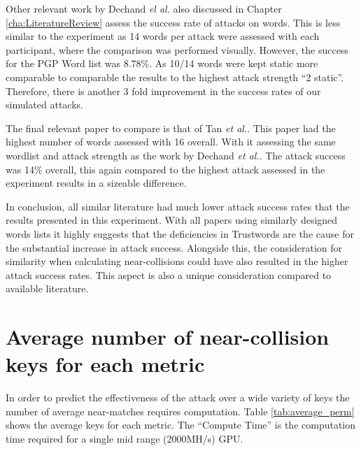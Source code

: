 Other relevant work by Dechand \textit{el al.}\cite{dechand2016empirical} also discussed in Chapter \ref{cha:LiteratureReview} assess the success rate of attacks on words. This is less similar to the experiment as 14 words per attack were assessed with each participant, where the comparison was performed visually. However, the success for the PGP Word list was 8.78\%. As 10/14 words were kept static more comparable to comparable the results to the highest attack strength ``2 static''. Therefore, there is another 3 fold improvement in the success rates of our simulated attacks. 

The final relevant paper to compare is that of Tan \textit{et al.}. This paper had the highest number of words assessed with 16 overall. With it assessing the same wordlist and attack strength as the work by Dechand \textit{et al.}. The attack success was 14\% overall, this again compared to the highest attack assessed in the experiment results in a sizeable difference.

In conclusion, all similar literature had much lower attack success rates that the results presented in this experiment. With all papers using similarly designed words lists it highly suggests that the deficiencies in Trustwords are the cause for the substantial increase in attack success. Alongside this, the consideration for similarity when calculating near-collisions could have also resulted in the higher attack success rates. This aspect is also a unique consideration compared to available literature.


\section{Average number of near-collision keys for each metric}
\label{sec:averagePerms}
In order to predict the effectiveness of the attack over a wide variety of keys the number of average near-matches requires computation. Table \ref{tab:average_perm} shows the average keys for each metric. The ``Compute Time'' is the computation time required for a single mid range (2000MH/s) GPU.

